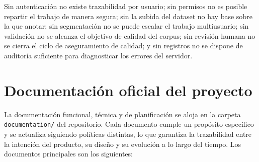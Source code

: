 Sin autenticación no existe trazabilidad por usuario; sin permisos no es
posible repartir el trabajo de manera segura; sin la subida del dataset no hay
base sobre la que anotar; sin segmentación no se puede escalar el trabajo
multiusuario; sin validación no se alcanza el objetivo de calidad del corpus;
sin revisión humana no se cierra el ciclo de aseguramiento de calidad; y sin
registros no se dispone de auditoría suficiente para diagnosticar los errores
del servidor.

\section{Documentación oficial del proyecto}
\label{sec:doc-proyecto}

La documentación funcional, técnica y de planificación se aloja en la carpeta
\texttt{docu\allowbreak menta\allowbreak tion/} del repositorio. Cada documento cumple un propósito
específico y se actualiza siguiendo políticas distintas, lo que garantiza la
trazabilidad entre la intención del producto, su diseño y su evolución a lo
largo del tiempo. Los documentos principales son los siguientes:

